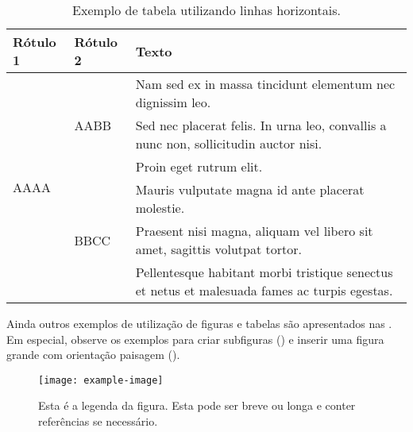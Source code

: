 \documentclass[portuguese]{textolivre}
\begin{document}
\begin{table}[htpb]
\begin{threeparttable}
\caption{Exemplo de tabela utilizando linhas horizontais.}
\label{tbl02}
\begin{tabular}{llp{11cm}}
\toprule
Rótulo 1 & Rótulo 2 & Texto \\
\midrule
\multirow{6}{*}{AAAA} & \multirow{3}{*}{AABB} & Nam sed ex in massa tincidunt elementum nec dignissim leo.  \\
 \cmidrule{3-3}
 & & Sed nec placerat felis. In urna leo, convallis a nunc non, sollicitudin auctor nisi. \\
 \cmidrule{3-3}
 & & Proin eget rutrum elit. \\
 \cmidrule{2-3}
 & \multirow{3}{*}{BBCC} & Mauris vulputate magna id ante placerat molestie. \\
 \cmidrule{3-3}
 & & Praesent nisi magna, aliquam vel libero sit amet, sagittis volutpat tortor. \\
 \cmidrule{3-3}
 & & Pellentesque habitant morbi tristique senectus et netus et malesuada fames ac turpis egestas. \\
\bottomrule
\end{tabular}
\end{threeparttable}
\end{table}

\lipsum[3]

Ainda outros exemplos de utilização de figuras e tabelas são apresentados nas . Em especial, observe os exemplos para criar subfiguras () e inserir uma figura grande com orientação paisagem ().

\begin{figure}[htbp]
\centering
\begin{minipage}{.6\textwidth}
\texttt{[image: example-image]}
\caption{Esta é a legenda da figura. Esta pode ser breve ou longa e conter referências se necessário.}
\label{fig:example}
\end{minipage}
\end{figure}
\end{document}
